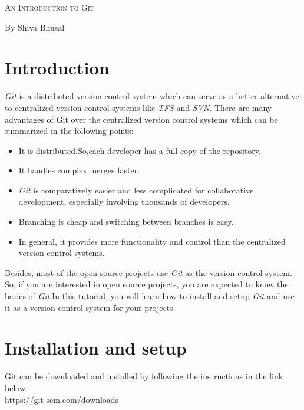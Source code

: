 \documentclass[letterpaper]{article}
\newcommand{\reporttitle}{An Introduction to Git}
\newcommand{\name}{By Shiva Bhusal}
\newcommand{\course}{}
\begin{document}
\begin{center}{\huge \scshape \reporttitle}\end{center}
\begin{center}\vspace{0.2em} {\Large \name\\}
  {\course}\end{center} 
  
\tableofcontents
  
\section{Introduction}
\textit{Git} is a distributed version control system which can serve as a better alternative to centralized version control systems like \textit{TFS} and \textit{SVN}. There are many advantages of Git over the centralized version control systems which can be summarized in the following points:
\begin{itemize}
    \item It is distributed.So,each developer has a full copy of the repository.
    \item It handles complex merges faster.
    \item \textit{Git} is comparatively easier and less complicated for collaborative development, especially involving thousands of developers.
    \item Branching is cheap and switching between branches is easy.
    \item In general, it provides more functionality and control than the centralized version control systems.
\end{itemize}

Besides, most of the open source projects use \textit{Git} as the version control system. So, if you are interested in open source projects, you are expected to know the basics of \textit{Git}.In this tutorial, you will learn how to install and setup \textit{Git} and use it as a version control system for your projects. 

\section{Installation and setup}
Git can be downloaded and installed by following the instructions in the link below.\\

\url{https://git-scm.com/downloads}
\\
\end{document}
